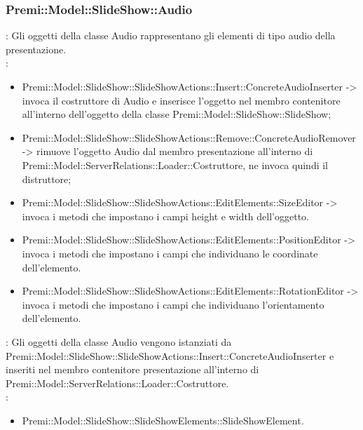 {                    \subsubsection{Premi::Model::SlideShow::Audio}{
				\textbf{\tipo}: Gli oggetti della classe Audio rappresentano gli elementi di tipo audio della presentazione.\\
				\textbf{\relaz}: 
				\begin{itemize}
					\item Premi::Model::SlideShow::SlideShowActions::Insert::ConcreteAudioInserter -> invoca il costruttore di Audio e inserisce l’oggetto nel membro contenitore all’interno dell’oggetto della classe Premi::Model::SlideShow::SlideShow;
                    \item Premi::Model::SlideShow::SlideShowActions::Remove::ConcreteAudioRemover -> rimuove l’oggetto Audio dal membro presentazione all’interno di Premi::Model::ServerRelations::Loader::Costruttore, ne invoca quindi il distruttore;
                    \item Premi::Model::SlideShow::SlideShowActions::EditElements::SizeEditor -> invoca i metodi che impostano i campi height e width dell'oggetto.
                    \item Premi::Model::SlideShow::SlideShowActions::EditElements::PositionEditor -> invoca i metodi che impostano i campi che individuano le coordinate dell'elemento.
                    \item Premi::Model::SlideShow::SlideShowActions::EditElements::RotationEditor -> invoca i metodi che impostano i campi che individuano l'orientamento dell'elemento.
				\end{itemize}	
                \textbf{\interfacce}: Gli oggetti della classe Audio vengono istanziati da Premi::Model::SlideShow::SlideShowActions::Insert::ConcreteAudioInserter e inseriti nel membro contenitore presentazione all’interno di Premi::Model::ServerRelations::Loader::Costruttore.\\
                \textbf{\base}: 
                    \begin{itemize}
                    \item Premi::Model::SlideShow::SlideShowElements::SlideShowElement.
                    \end{itemize}
                    }
}
